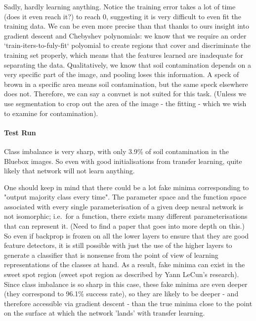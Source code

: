 \documentclass[a4paper,11pt]{article}
\begin{document}
Sadly, hardly learning anything. Notice the training error takes a lot of time (does it even reach it?) to reach 0,  suggesting it is very difficult to even fit the training data. We can be even more precise than that thanks to ours insight into gradient descent and Chebyshev polynomials: we know that we require an order `train-iters-to-fuly-fit` polyomial to create regions that cover and discriminate the training set properly, which means that the features learned are inadequate for separating the data. Qualitatively, we know that soil contamination depends on a very specific part of the image, and pooling loses this information. A speck of brown in a specific area means soil contamination, but the same speck elsewhere does not. Therefore, we can say a convnet is not suited for this task. (Unless we use segmentation to crop out the area of the image - the fitting - which we wish to examine for contamination). \\

\paragraph{Test Run}

Class imbalance is very sharp, with only 3.9\% of soil contamination in the Bluebox images. So even with good initialisations from transfer learning, quite likely that network will not learn anything.

One should keep in mind that there could be a lot fake minima corresponding to "output majority class every time". The parameter space and the function space associated with every single parameterisation of a given deep neural network is not isomorphic; i.e.\ for a function, there exists many different parameterisations that can represent it. (Need to find a paper that goes into more depth on this.) \\

So even if backprop is frozen on all the lower layers to ensure that they are good feature detectors, it is still possible with just the use of the higher layers to generate a classifier that is nonsense from the point of view of learning representations of the classes at hand. As a result, fake minima can exist in the sweet spot region (sweet spot region as described by Yann LeCun's research). Since class imbalance is so sharp in this case, these fake minima are even deeper (they correspond to 96.1\% success rate), so they are likely to be deeper - and therefore accessible via gradient descent - than the true minima close to the point on the surface at which the network 'lands' with transfer learning. \\
\end{document}
